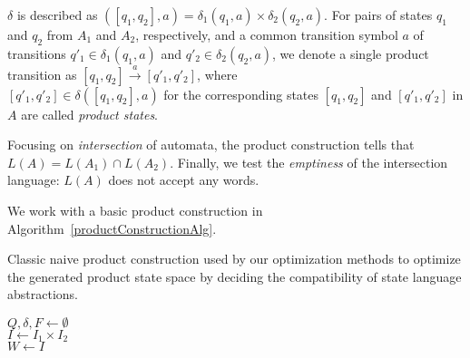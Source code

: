 $\delta$ is described as $([q_1, q_2], a) = \delta_1(q_1, a) \times \delta_2(q_2, a)$. For pairs of states $q_1$ and $q_2$ from $A_1$ and $A_2$, respectively, and a common transition symbol $a$ of transitions $q'_1 \in \delta_1(q_1, a)$ and $q'_2 \in \delta_2(q_2,a)$, we denote a single product transition as $[q_1, q_2] \xrightarrow{a} [q'_1, q'_2]$, where \\ $[q'_1, q'_2] \in \delta([q_1, q_2], a)$ for the corresponding states $[q_1, q_2]$ and $[q'_1, q'_2]$ in $A$ are called \emph{product states}.

Focusing on \emph{intersection} of automata, the product construction tells that \\ $ L(A) = L(A_1) \cap L(A_2) $. Finally, we test the \emph{emptiness} of the intersection language: $L(A)$ does not accept any words.

We work with a basic product construction in Algorithm~\ref{productConstructionAlg}.

\begin{algorithm}[ht]
\caption{Classic naive product construction used by our optimization methods to optimize the generated product state space by deciding the compatibility of state language abstractions.}\label{productConstructionAlg}
\DontPrintSemicolon
{}
\BlankLine
$Q, \delta, F \gets \emptyset$ \\
$I \gets I_1 \times I_2$ \\
$W \gets  I$

\end{algorithm}

